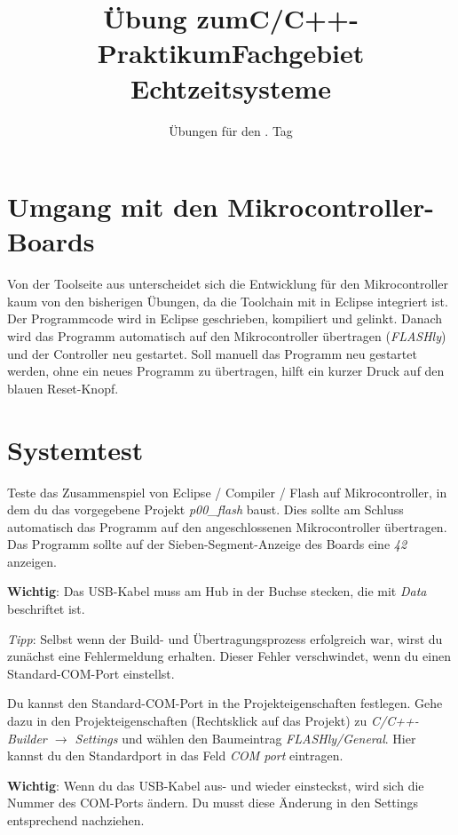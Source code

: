 \documentclass[
  accentcolor=tud1c,	%
  colorbacktitle,		%
  inverttitle,			%
  german,				%
  twoside
]{tudexercise}
\title{Übung zum\linebreak[1]C/C++-Praktikum\linebreak[1] Fachgebiet Echtzeitsysteme}
\subtitle{Übungen für den \tag{}. Tag}
\newcommand{\tag}{5}
\begin{document}
\begin{examheader}
	\textmb{Übung zum C/C++-Praktikum - Tag \tag{}}
\end{examheader}
\maketitle 


\section{Umgang mit den Mikrocontroller-Boards}

Von der Toolseite aus unterscheidet sich die Entwicklung für den Mikrocontroller kaum von den bisherigen Übungen, da die Toolchain mit in Eclipse integriert ist.
Der Programmcode wird in Eclipse geschrieben, kompiliert und gelinkt.
Danach wird das Programm automatisch auf den Mikrocontroller übertragen (\emph{FLASHly}) und der Controller neu gestartet.
Soll manuell das Programm neu gestartet werden, ohne ein neues Programm zu übertragen, hilft ein kurzer Druck auf den blauen Reset-Knopf.


\section{Systemtest}

Teste das Zusammenspiel von Eclipse / Compiler / Flash auf Mikrocontroller, in dem du das vorgegebene Projekt \emph{p00\_flash} baust.
Dies sollte am Schluss automatisch das Programm auf den angeschlossenen Mikrocontroller übertragen.
Das Programm sollte auf der Sieben-Segment-Anzeige des Boards eine \textit{42} anzeigen.

\textbf{Wichtig}: Das USB-Kabel muss am Hub in der Buchse stecken, die mit \emph{Data} beschriftet ist.

\emph{Tipp}:
Selbst wenn der Build- und Übertragungsprozess erfolgreich war, wirst du zunächst eine Fehlermeldung erhalten.
Dieser Fehler verschwindet, wenn du einen Standard-COM-Port einstellst.

Du kannst den Standard-COM-Port in the Projekteigenschaften festlegen.
Gehe dazu in den Projekteigenschaften (Rechtsklick auf das Projekt) zu \emph{C/C++-Builder $\to$ Settings} und wählen den Baumeintrag \emph{FLASHly/General}.
Hier kannst du den Standardport in das Feld \emph{COM port} eintragen.

\textbf{Wichtig}: Wenn du das USB-Kabel aus- und wieder einsteckst, wird sich die Nummer des COM-Ports ändern.
Du musst diese Änderung in den Settings entsprechend nachziehen.
\end{document}
